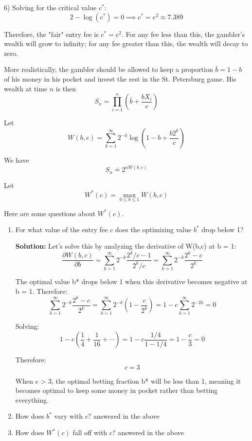 \documentclass{article}
\begin{document}
\begin{enumerate}
    6) Solving for the critical value $c^*$:
    \[
        2 - \log(c^*) = 0 \implies c^* = e^2 \approx 7.389
    \]

    Therefore, the "fair" entry fee is $c^* = e^2$. For any fee less than this, the gambler's wealth will grow to infinity; for any fee greater than this, the wealth will decay to zero.
        


    More realistically, the gambler should be allowed to keep a proportion $\bar{b} = 1-b$ of his money in his pocket and invest the rest in the St. Petersburg game. His wealth at time $n$ is then
    \[
        S_n = \prod_{i=1}^n \left(\bar{b} + \frac{bX_i}{c}\right)
    \]

    Let
    \[
        W(b,c) = \sum_{k=1}^{\infty} 2^{-k} \log\left(1-b+\frac{b2^k}{c}\right)
    \]

    We have
    \[
        S_n \doteq 2^{nW(b,c)}
    \]

    Let
    \[
        W^*(c) = \max_{0 \leq b \leq 1} W(b,c)
    \]

    Here are some questions about $W^*(c)$.
    \begin{enumerate}
        \item For what value of the entry fee $c$ does the optimizing value $b^*$ drop below 1?
        
        \textbf{Solution:} Let's solve this by analyzing the derivative of W(b,c) at b = 1:
        \[
            \frac{\partial W(b,c)}{\partial b} = \sum_{k=1}^{\infty} 2^{-k} \frac{2^k/c - 1}{2^k/c } = \sum_{k=1}^{\infty} 2^{-k} \frac{2^k - c}{2^k}
        \]
        
        The optimal value b* drops below 1 when this derivative becomes negative at b = 1. Therefore:
        \[
            \sum_{k=1}^{\infty} 2^{-k} \frac{2^k - c}{2^k} = \sum_{k=1}^{\infty} 2^{-k}(1 - \frac{c}{2^k}) = 1 - c\sum_{k=1}^{\infty} 2^{-2k} = 0
        \]
        
        Solving:
        \[
            1 - c(\frac{1}{4} + \frac{1}{16} + \cdots) = 1 - c\frac{1/4}{1-1/4} = 1 - \frac{c}{3} = 0
        \]
        
        Therefore:
        \[
            c = 3
        \]
        
        When c > 3, the optimal betting fraction b* will be less than 1, meaning it becomes optimal to keep some money in pocket rather than betting everything.

        \item How does $b^*$ vary with $c$? answered in the above
        \item How does $W^*(c)$ fall off with $c$? answered in the above
    \end{enumerate}


\end{enumerate}
\end{document}
